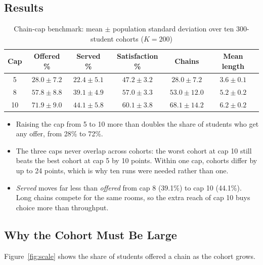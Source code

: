 \subsection{Results}

\begin{table}[H]
\centering
\begin{tabular}{cccccc}
\toprule
\textbf{Cap} & \textbf{Offered \%} & \textbf{Served \%} & \textbf{Satisfaction \%} & \textbf{Chains} & \textbf{Mean length} \\
\midrule
5  & $28.0 \pm 7.2$ & $22.4 \pm 5.1$ & $47.2 \pm 3.2$ & $28.0 \pm 7.2$  & $3.6 \pm 0.1$ \\
8  & $57.8 \pm 8.8$ & $39.1 \pm 4.9$ & $57.0 \pm 3.3$ & $53.0 \pm 12.0$ & $5.2 \pm 0.2$ \\
10 & $71.9 \pm 9.0$ & $44.1 \pm 5.8$ & $60.1 \pm 3.8$ & $68.1 \pm 14.2$ & $6.2 \pm 0.2$ \\
\bottomrule
\end{tabular}
\caption{Chain-cap benchmark: mean $\pm$ population standard deviation over ten 300-student cohorts ($K = 200$)}
\label{tab:cap}
\end{table}

\begin{itemize}
  \item Raising the cap from 5 to 10 more than doubles the share of
  students who get any offer, from 28\% to 72\%.
  \item The three caps never overlap across cohorts: the worst cohort at
  cap 10 still beats the best cohort at cap 5 by 10 points. Within one
  cap, cohorts differ by up to 24 points, which is why ten runs were
  needed rather than one.
  \item \emph{Served} moves far less than \emph{offered} from cap 8
  (39.1\%) to cap 10 (44.1\%). Long chains compete for the same rooms,
  so the extra reach of cap 10 buys choice more than throughput.
\end{itemize}

\subsection{Why the Cohort Must Be Large}

Figure~\ref{fig:scale} shows the share of students offered a chain as
the cohort grows.

